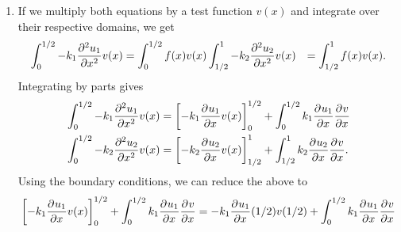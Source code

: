 {\begin{solution}
\begin{enumerate}
For $i = 2$, $K_{ij} \neq 0$ for $j = 1, 2,3$.  Here, we have to be a little more careful, since the integral goes from $x_1 = 1/4$ to $x_3 = 3/4$, and $k(x)$ has a jump over this interval.  $K_{12}=K_{21}$ by symmetry, so we only need to compute $K_{22}$ and $K_{32}$
\begin{align*}
K_{22} &= \int_0^1 k(x) \phi_2'(x)\phi_2'(x) = \int_{x_1}^{x_3}k(x) \frac{1}{h}\frac{1}{h} = \frac{1}{h^2}\int_{1/4}^{3/4}k(x) \\
&= \frac{1}{h^2}\left(\int_{1/4}^{1/2} k_1 + \int_{1/2}^{3/4} k_2\right) = \left( k_1 + k_2\right)\frac{1}{h}
\end{align*}
\[
K_{32} = \int_0^1 k(x) \phi_3'(x)\phi_2'(x) = \int_{x_2}^{x_3} k(x)\frac{-1}{h}\frac{1}{h} = \frac{-1}{h^2}\int_{1/2}^{3/4} k_2 = -k_2\frac{1}{h}.
\]
For $i = 3$, we have roughly the same case as with $i = 1$ since $k(x) = k_2$ for all the integrals in this problem.  
\[
K_{33} = \int_0^1 k(x) \phi_3'(x)\phi_3'(x) = \int_{x_2}^{x_4} k_2 \frac{1}{h^2} = k_2\frac{1}{h^2}\int_0^{2h} = k_2\frac{2}{h}
\]
\[
K_{34} = \int_0^1 k(x) \phi_4'(x)\phi_3'(x) = \int_{x_3}^{x_4} k_2\frac{-1}{h}\frac{1}{h} = k_2\frac{-1}{h}.
\]
Finally, for $i = 4$, we have
\[
K_{44} = \int_0^1 k(x) \phi_4'(x)\phi_4'(x) = \int_{x_3}^{x_4} k_2 \frac{1}{h^2} = k_2\frac{1}{h}.
\]
For $b_i = (f,\phi_i) + \beta \phi_i(1)$, we have (due to the fact that $\phi_i(1) = 0$ unless $i = 4$, in which case $\phi_4(1) = 1$)
\[
b_i = \begin{cases}
(f,\phi_i), & i < 4 \\
(f,\phi_4) + \beta, & i = 4.
\end{cases}
\]
\item If we multiply both equations by a test function $v(x)$ and integrate over their respective domains, we get
 \begin{align*}
\int_0^{1/2}-k_1\frac{\partial^{2} u_1}{\partial x^{2}}v(x) &= \int_0^{1/2}f(x)v(x)
\int_{1/2}^1-k_2\frac{\partial^{2} u_2}{\partial x^{2}}v(x) &= \int_{1/2}^1f(x)v(x).
 \end{align*}
 Integrating by parts gives
 \begin{align*}
\int_0^{1/2}-k_1\frac{\partial^{2} u_1}{\partial x^{2}}v(x) &= \left[-k_1\frac{\partial^{} u_1}{\partial x^{}}v(x)\right]_0^{1/2} + \int_0^{1/2}k_1 \frac{\partial^{} u_1}{\partial x^{}}\frac{\partial^{} v}{\partial x^{}}\\
\int_0^{1/2}-k_2\frac{\partial^{2} u_2}{\partial x^{2}}v(x) &= \left[-k_2\frac{\partial^{} u_2}{\partial x^{}}v(x)\right]_{1/2}^1 + \int_{1/2}^1 k_2 \frac{\partial^{} u_2}{\partial x^{}}\frac{\partial^{} v}{\partial x^{}}.
 \end{align*}
 Using the boundary conditions, we can reduce the above to
  \begin{align*}
\left[-k_1\pd{u_1}{x}{}v(x)\right]_0^{1/2} + \int_0^{1/2}k_1 \pd{u_1}{x}{}\pd{v}{x}{} &= -k_1\pd{u_1}{x}{}(1/2)v(1/2) + \int_0^{1/2}k_1 \pd{u_1}{x}{}\pd{v}{x}{}\\

\end{align*}
\end{enumerate}
\end{solution}}
